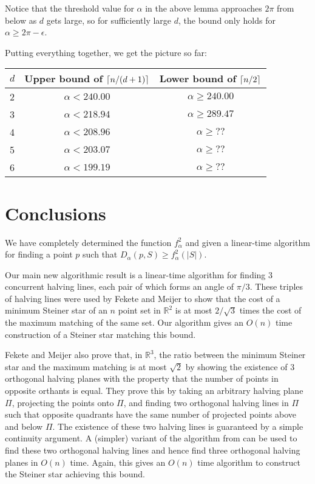 \documentclass[lotsofwhite]{patmorin}
\begin{document}
{Notice that the threshold value for $\alpha$ in the above lemma
approaches $2\pi$ from below as $d$ gets large, so for sufficiently
large $d$, the bound only holds for $\alpha \ge 2\pi -\epsilon$.

Putting everything together, we get the picture so far:

\begin{tabular}{l|cc}
$d$ & Upper bound of $\left\lceil n/(d+1) \right\rceil$ & Lower bound of $\left\lceil n/2 \right\rceil$ \\
\hline
2 & $\alpha < 240.00$ & $\alpha \ge 240.00$ \\
3 & $\alpha < 218.94$ & $\alpha \ge 289.47$ \\
4 & $\alpha < 208.96$ & $\alpha \ge ??$ \\
5 & $\alpha < 203.07$ & $\alpha \ge ??$ \\
6 & $\alpha < 199.19$ & $\alpha \ge ??$ \\
\end{tabular}
}





\section{Conclusions}

We have completely determined the function $f^2_\alpha$ and given a
linear-time algorithm for finding a point $p$ such that
$D_\alpha(p,S)\ge f^2_\alpha(|S|)$.  

Our main new algorithmic result is a linear-time algorithm for finding
3 concurrent halving lines, each pair of which forms an angle of
$\pi/3$.  These triples of halving lines were used by Fekete and
Meijer \cite{fm00}
to show that the cost of a minimum Steiner star of an $n$ point
set in $\mathbb{R}^2$ is at most $2/\sqrt{3}$ times the cost of the
maximum matching of the same set.  Our algorithm gives an $O(n)$ time
construction of a Steiner star matching this bound.  

Fekete and Meijer also prove that, in $\mathbb{R}^3$, the ratio
between the minimum Steiner star and the maximum matching is at most
$\sqrt{2}$ by showing the existence of 3 orthogonal halving planes
with the property that the number of points in opposite orthants is
equal.  They prove this by taking an arbitrary halving plane $\Pi$,
projecting the points onto $\Pi$, and finding two orthogonal halving
lines in $\Pi$ such that opposite quadrants have the same number of
projected points above and below $\Pi$. The existence of these two
halving lines is guaranteed by a simple continuity argument.   A
(simpler) variant of the algorithm from  can be
used to find these two orthogonal halving lines and hence find three
orthogonal halving planes in $O(n)$ time.  Again, this gives an $O(n)$
time algorithm to construct the Steiner star achieving this bound.
\end{document}
